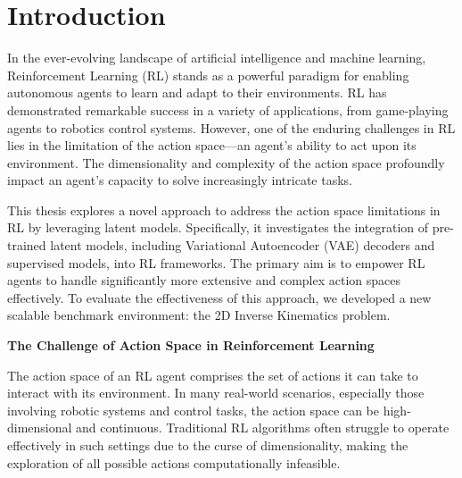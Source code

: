 \chapter{Introduction}\label{chap:introduction}




In the ever-evolving landscape of artificial intelligence and machine learning, Reinforcement Learning (RL) stands as a powerful paradigm for enabling autonomous agents to learn and adapt to their environments. RL has demonstrated remarkable success in a variety of applications, from game-playing agents to robotics control systems. However, one of the enduring challenges in RL lies in the limitation of the action space—an agent's ability to act upon its environment. The dimensionality and complexity of the action space profoundly impact an agent's capacity to solve increasingly intricate tasks.

This thesis explores a novel approach to address the action space limitations in RL by leveraging latent models. Specifically, it investigates the integration of pre-trained latent models, including Variational Autoencoder (VAE) decoders and supervised models, into RL frameworks. The primary aim is to empower RL agents to handle significantly more extensive and complex action spaces effectively. To evaluate the effectiveness of this approach, we developed a new scalable benchmark environment: the 2D Inverse Kinematics problem.

\textbf{The Challenge of Action Space in Reinforcement Learning}

The action space of an RL agent comprises the set of actions it can take to interact with its environment. In many real-world scenarios, especially those involving robotic systems and control tasks, the action space can be high-dimensional and continuous. Traditional RL algorithms often struggle to operate effectively in such settings due to the curse of dimensionality, making the exploration of all possible actions computationally infeasible.

